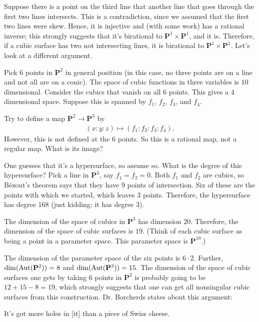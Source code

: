 \documentclass[11pt, oneside,margin=1in]{article}
\begin{document}
Suppose there is a point on the third line that another line that goes through the first two lines intersects. This is a contradiction, since we assumed that the first two lines were skew. Hence, it is injective and (with some work) has a rational inverse; this strongly suggests that it's birational to $ \mathbf{P}^1\times \mathbf{P}^1$, and it is. Therefore, if a cubic surface has two not intersecting lines, it is birational to $\mathbf{P}^1\times \mathbf{P}^1$. Let's look at a different argument.

Pick $6$ points in $\mathbf{P}^2$ in general position (in this case, no three points are on a line and not all are on a conic). The space of cubic functions in three variables is $10$ dimensional. Consider the cubics that vanish on all $6$ points. This gives a $4$ dimensional space. Suppose this is spanned by $f_1$, $f_2$, $f_3$, and $f_4$.

Try to define a map $\mathbf{P}^2 \longrightarrow \mathbf{P}^3$ by 
\begin{align*}
	(x:y:z)\longmapsto  (f_1:f_2:f_3:f_4).
\end{align*}
However, this is not defined at the $6$ points. So this is a rational map, not a regular map. What is its image?

One guesses that it's a hypersurface, so assume so. What is the degree of this hypersurface? Pick a line in $\mathbf{P}^3$, say $f_1=f_2=0$. Both $f_1$ and $f_2$ are cubics, so B\'ezout's theorem says that they have $9$ points of intersection. Six of these are the points with which we started, which leaves $3$ points. Therefore, the hypersurface has degree $168$ (just kidding: it has degree $3$).

The dimension of the space of cubics in $\mathbf{P}^3$ has dimension $20$. Therefore, the dimension of the space of cubic surfaces is $19$.  (Think of each cubic surface as being a point in a parameter space. This parameter space is $\mathbf{P}^{19}$.) 

The dimension of the parameter space of the six points is $6\cdot 2$. Further, $\dim (\operatorname{Aut}(\mathbf{P}^2))=8$ and $\dim(\operatorname{Aut}(\mathbf{P}^3)) =15$. The dimension of the space of cubic surfaces one gets by taking $6$ points in $\mathbf{P}^2$ is probably going to be $12+15-8=19$, which strongly suggests that one can get all nonsingular cubic surfaces from this construction. Dr. Borcherds states about this argument:
\begin{center}
	\small It's got more holes in [it] than a piece of Swiss cheese.
\end{center}
\end{document}
